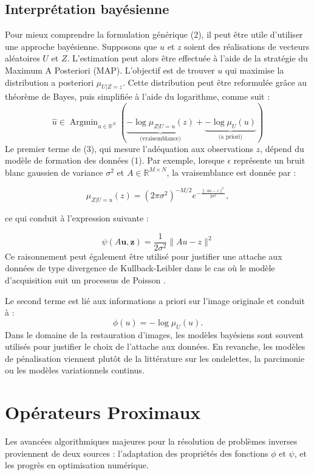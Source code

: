 \documentclass[a4paper, 12pt]{report} %
\begin{document}
\subsection{Interprétation bayésienne}
Pour mieux comprendre la formulation générique (2), il peut être utile d’utiliser une approche bayésienne. Supposons que \( u \) et \( z \) soient des réalisations de vecteurs aléatoires \( U \) et \( Z \). L’estimation peut alors être effectuée à l’aide de la stratégie du Maximum A Posteriori (MAP). L’objectif est de trouver \( u \) qui maximise la distribution a posteriori \( \mu_{U|Z=z} \). Cette distribution peut être reformulée grâce au théorème de Bayes, puis simplifiée à l’aide du logarithme, comme suit :
\[
\hat{u} \in \operatorname{Argmin}_{u \in \mathbb{R}^N} \left( 
\underbrace{-\log \mu_{Z|U=u}(z)}_{\text{(vraisemblance)}} + 
\underbrace{-\log \mu_U(u)}_{\text{(a priori)}}
\right) \tag{3}
\]
Le premier terme de (3), qui mesure l’adéquation aux observations \( z \), dépend du modèle de formation des données (1). Par exemple, lorsque \( \epsilon \) représente un bruit blanc gaussien de variance \( \sigma^2 \) et \( A \in \mathbb{R}^{M \times N} \), la vraisemblance est donnée par :

\begin{equation}
\mu_{Z|U=u}(z) = (2\pi\sigma^2)^{-M/2} e^{-\frac{\|Au - z\|^2}{2\sigma^2}},
\end{equation}

ce qui conduit à l’expression suivante :

\begin{equation}
\psi(A\mathbf{u}, \mathbf{z}) = \frac{1}{2\sigma^2} \|Au - z\|^2 
\end{equation} 
Ce raisonnement peut également être utilisé pour justifier une attache aux données de type divergence de Kullback-Leibler dans le cas où le modèle d’acquisition suit un processus de Poisson \cite{pustelnik2016wavelet}.

Le second terme est lié aux informations a priori sur l’image originale et conduit à :
\begin{equation}
\phi(u) = -\log \mu_U(u).
\end{equation}
Dans le domaine de la restauration d’images, les modèles bayésiens sont souvent utilisés pour justifier le choix de l’attache aux données. En revanche, les modèles de pénalisation viennent plutôt de la littérature sur les ondelettes, la parcimonie ou les modèles variationnels continus.

\section{Opérateurs Proximaux}
Les avancées algorithmiques majeures pour la résolution de problèmes inverses proviennent de deux sources : l’adaptation des propriétés des fonctions \(\phi\) et \(\psi\), et les progrès en optimisation numérique.
\end{document}
